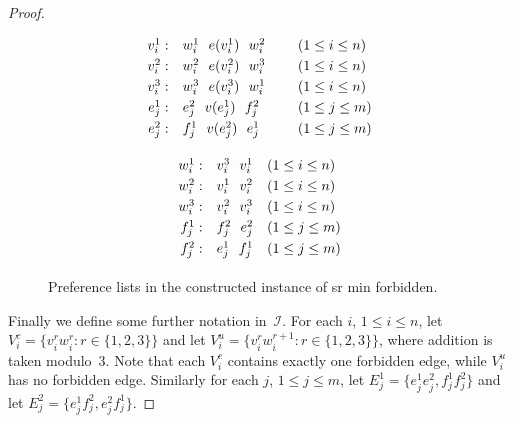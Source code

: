 \documentclass[preprint,12pt]{elsarticle}
\begin{document}
\begin{proof}
\begin{figure}[h]
\centering
\begin{minipage}{0.4\textwidth}
\[
\begin{array}{rll}
v_i^1: & w_i^1 ~~ e(v_i^1) ~~ w_i^2 ~~~~ & (1\leq i\leq n) \vspace{1mm}\\
v_i^2: & w_i^2 ~~ e(v_i^2) ~~ w_i^3 & (1\leq i\leq n) \vspace{1mm}\\
v_i^3: & w_i^3 ~~ e(v_i^3) ~~ w_i^1 & (1\leq i\leq n) \vspace{1mm}\\
e_j^1: & e_j^2 ~~ v(e_j^1) ~~ f_j^2 & (1\leq j\leq m) \vspace{1mm}\\
e_j^2: & f_j^1 ~~ v(e_j^2) ~~ e_j^1 & (1\leq j\leq m) \vspace{1mm}
\end{array}
\]
\end{minipage}\hspace{15mm}\begin{minipage}{0.4\textwidth}
\[
		\begin{array}{rll}
w_i^1: & v_i^3 ~~ v_i^1             & (1\leq i\leq n) \vspace{1mm}\\
w_i^2: & v_i^1 ~~ v_i^2             & (1\leq i\leq n) \vspace{1mm}\\
w_i^3: & v_i^2 ~~ v_i^3             & (1\leq i\leq n) \vspace{1mm}\\
f_j^1: & f_j^2 ~~ e_j^2             & (1\leq j\leq m) \vspace{1mm}\\
f_j^2: & e_j^1 ~~ f_j^1             & (1\leq j\leq m) \vspace{1mm}
\end{array}
\]
\end{minipage}
\caption{Preference lists in the constructed instance of {\sc sr min forbidden}.}
\label{preflists}
\end{figure}

Finally we define some further notation in~$\mathcal{I}$. For each $i$, $1\leq i\leq n$, let $V_i^c=\{v_i^r w_i^r : r \in \{1,2,3\}\}$ and let
$V_i^u=\{v_i^r w_i^{r+1} : r \in \{1,2,3\}\}$, where addition is taken modulo~3. Note that each $V_i^c$ contains exactly one forbidden edge, while $V_i^u$ has no forbidden edge. Similarly for each $j$, $1\leq j\leq m$, let $E_j^1=\{e_j^1 e_j^2,f_j^1 f_j^2\}$ and let
$E_j^2=\{e_j^1 f_j^2,e_j^2 f_j^1\}$.


\end{proof}
\end{document}
